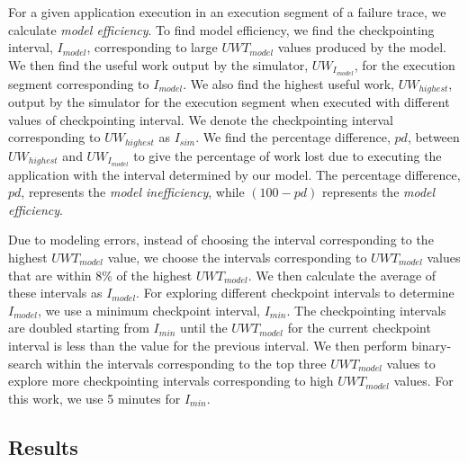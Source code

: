 \documentclass[conference,10pt]{IEEEtran}
\begin{document}
For a given application execution in an execution segment of a failure
trace, we calculate {\em model efficiency}. To find model efficiency,
we find the checkpointing interval, $I_{model}$, corresponding to
large $UWT_{model}$ values produced by the model. We then find the
useful work output by the simulator,  $UW_{I_{model}}$, for the
execution segment corresponding to $I_{model}$. We also find the
highest useful work, $UW_{highest}$, output by the simulator for the
execution segment when executed with different values of checkpointing
interval. We denote the checkpointing interval corresponding to
$UW_{highest}$ as $I_{sim}$. We find the percentage difference, $pd$,
between $UW_{highest}$ and $UW_{I_{model}}$ to give the percentage of
work lost due to executing the application with the interval
determined by our model. The percentage difference, $pd$, represents
the {\em model inefficiency}, while $(100-pd)$ represents the {\em
  model efficiency}.

Due to modeling errors, instead of choosing the interval corresponding
to the highest $UWT_{model}$ value, we choose the intervals
corresponding to $UWT_{model}$ values that are within 8\% of the
highest $UWT_{model}$. We then calculate the average of these
intervals as $I_{model}$. For exploring different checkpoint intervals
to determine $I_{model}$, we use a minimum checkpoint interval,
$I_{min}$. The checkpointing intervals are doubled starting from
$I_{min}$ until the $UWT_{model}$ for the current checkpoint interval
is less than the value for the previous interval. We then perform
binary-search within the intervals corresponding to the top three
$UWT_{model}$ values to explore more checkpointing intervals
corresponding to high $UWT_{model}$ values. For this work, we use 5
minutes for $I_{min}$.

\subsection{Results}
\end{document}
